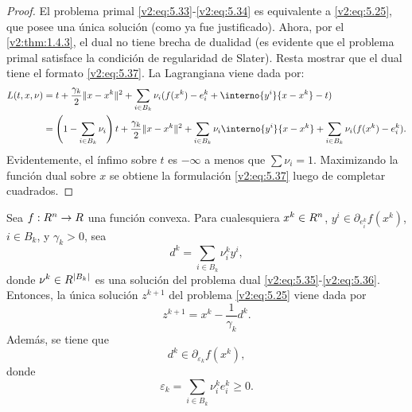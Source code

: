 \begin{proof}
    El problema primal \eqref{v2:eq:5.33}-\eqref{v2:eq:5.34} es equivalente a \eqref{v2:eq:5.25}, que posee una única solución (como ya fue justificado). Ahora, por el \cref{v2:thm:1.4.3}, el dual no tiene brecha de dualidad (es evidente que el problema primal satisface la condición de regularidad de Slater).
    Resta mostrar que el dual tiene el formato \eqref{v2:eq:5.37}. La Lagrangiana viene dada por:
    \begin{align}
        L(t, x, \nu) &= t + \frac{\gamma_k}{2} \norm{x - x^k}^2 + \sum_{i \in B_k} \nu_i(f(x^k) - e_i^k + \interno{y^i}{x - x^k} - t) \label{v2:eq:5.38} \\
        &= \left( 1 - \sum_{i \in B_k} \nu_i \right)t + \frac{\gamma_k}{2} \norm{x - x^k}^2 + \sum_{i \in B_k} \nu_i \interno{y^i}{x - x^k} + \sum_{i \in B_k} \nu_i(f(x^k) - e_i^k). \nonumber
    \end{align}
    Evidentemente, el ínfimo sobre $t$ es $-\infty$ a menos que $\sum \nu_i = 1$. Maximizando la función dual sobre $x$ se obtiene la formulación \eqref{v2:eq:5.37} luego de completar cuadrados.
\end{proof}

\begin{lemma}\label{v2:lem:5.3.2}
    Sea $f : R^n \to R$ una función convexa. Para cualesquiera $x^k \in R^n$, $y^i \in \partial_{e_i^k} f(x^k)$, $i \in B_k$, y $\gamma_k > 0$, sea
    \begin{equation}
        d^k = \sum_{i \in B_k} \nu_i^k y^i,
        \label{v2:eq:5.39}
    \end{equation}
    donde $\nu^k \in R^{|B_k|}$ es una solución del problema dual \eqref{v2:eq:5.35}-\eqref{v2:eq:5.36}. Entonces, la única solución $z^{k+1}$ del problema \eqref{v2:eq:5.25} viene dada por
    \begin{equation}
        z^{k+1} = x^k - \frac{1}{\gamma_k} d^k.
        \label{v2:eq:5.40}
    \end{equation}
    Además, se tiene que
    \begin{equation}
        d^k \in \partial_{\varepsilon_k} f(x^k),
        \label{v2:eq:5.41}
    \end{equation}
    donde
    \begin{equation}
        \varepsilon_k = \sum_{i \in B_k} \nu_i^k e_i^k \ge 0.
        \label{v2:eq:5.42}
    \end{equation}
\end{lemma}

